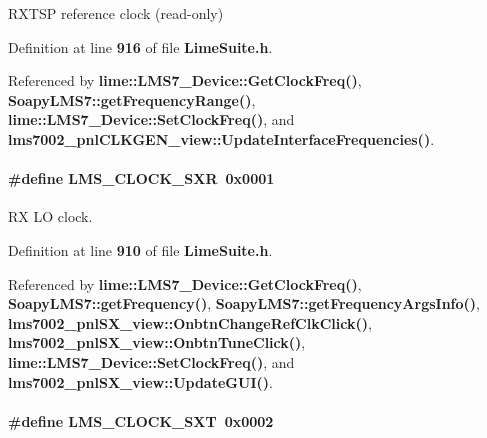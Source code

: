 R\+X\+T\+SP reference clock (read-\/only) 



Definition at line {\bf 916} of file {\bf Lime\+Suite.\+h}.



Referenced by {\bf lime\+::\+L\+M\+S7\+\_\+\+Device\+::\+Get\+Clock\+Freq()}, {\bf Soapy\+L\+M\+S7\+::get\+Frequency\+Range()}, {\bf lime\+::\+L\+M\+S7\+\_\+\+Device\+::\+Set\+Clock\+Freq()}, and {\bf lms7002\+\_\+pnl\+C\+L\+K\+G\+E\+N\+\_\+view\+::\+Update\+Interface\+Frequencies()}.

\paragraph[{L\+M\+S\+\_\+\+C\+L\+O\+C\+K\+\_\+\+S\+XR}]{\setlength{\rightskip}{0pt plus 5cm}\#define L\+M\+S\+\_\+\+C\+L\+O\+C\+K\+\_\+\+S\+XR~0x0001}\label{group__LMS__CLOCK__ID_gad6ab0c09df6c5e25e420d19f69497817}


RX LO clock. 



Definition at line {\bf 910} of file {\bf Lime\+Suite.\+h}.



Referenced by {\bf lime\+::\+L\+M\+S7\+\_\+\+Device\+::\+Get\+Clock\+Freq()}, {\bf Soapy\+L\+M\+S7\+::get\+Frequency()}, {\bf Soapy\+L\+M\+S7\+::get\+Frequency\+Args\+Info()}, {\bf lms7002\+\_\+pnl\+S\+X\+\_\+view\+::\+Onbtn\+Change\+Ref\+Clk\+Click()}, {\bf lms7002\+\_\+pnl\+S\+X\+\_\+view\+::\+Onbtn\+Tune\+Click()}, {\bf lime\+::\+L\+M\+S7\+\_\+\+Device\+::\+Set\+Clock\+Freq()}, and {\bf lms7002\+\_\+pnl\+S\+X\+\_\+view\+::\+Update\+G\+U\+I()}.

\paragraph[{L\+M\+S\+\_\+\+C\+L\+O\+C\+K\+\_\+\+S\+XT}]{\setlength{\rightskip}{0pt plus 5cm}\#define L\+M\+S\+\_\+\+C\+L\+O\+C\+K\+\_\+\+S\+XT~0x0002}\label{group__LMS__CLOCK__ID_gad8512e8c6346b2da2cdc68914c421b44}


